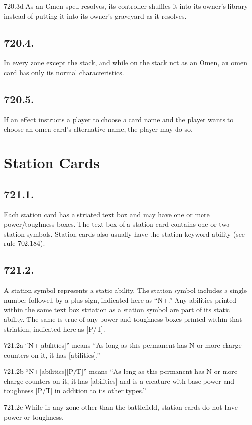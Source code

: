 720.3d As an Omen spell resolves, its controller shuffles it into its owner’s library instead of putting it into its owner’s graveyard as it resolves.

\subsection*{720.4.}
In every zone except the stack, and while on the stack not as an Omen, an omen card has only its normal characteristics.

\subsection*{720.5.}
If an effect instructs a player to choose a card name and the player wants to choose an omen card’s alternative name, the player may do so.

\section{Station Cards}
\subsection*{721.1.}
Each station card has a striated text box and may have one or more power/toughness boxes. The text box of a station card contains one or two station symbols. Station cards also usually have the station keyword ability (see rule 702.184).

\subsection*{721.2.}
A station symbol represents a static ability. The station symbol includes a single number followed by a plus sign, indicated here as “{N+}.” Any abilities printed within the same text box striation as a station symbol are part of its static ability. The same is true of any power and toughness boxes printed within that striation, indicated here as [P/T].

721.2a “{N+}[abilities]” means “As long as this permanent has N or more charge counters on it, it has [abilities].”

721.2b “{N+}[abilities][P/T]” means “As long as this permanent has N or more charge counters on it, it has [abilities] and is a creature with base power and toughness [P/T] in addition to its other types.”

721.2c While in any zone other than the battlefield, station cards do not have power or toughness.

